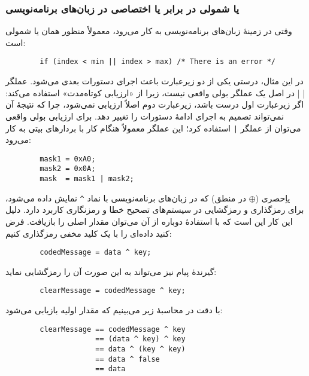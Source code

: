       \subsubsection*{یا شمولی در برابر یا اختصاصی در زبان‌های برنامه‌نویسی}
      وقتی  در زمینهٔ زبان‌های برنامه‌نویسی به کار می‌رود، معمولاً منظور همان یا شمولی است:
        \begin{latin}
        \begin{verbatim}
        if (index < min || index > max) /* There is an error */
        \end{verbatim}
        \end{latin}
        در این مثال، درستی یکی از دو زیرعبارت باعث اجرای دستورات بعدی می‌شود. عملگر \verb| || | در اصل یک عملگر بولی واقعی نیست، زیرا از «ارزیابی کوتاه‌مدت»  استفاده می‌کند: اگر زیرعبارت اول درست باشد، زیرعبارت دوم اصلاً ارزیابی نمی‌شود، چرا که نتیجهٔ آن نمی‌تواند تصمیم به اجرای ادامهٔ دستورات را تغییر دهد.
        برای ارزیابی بولی واقعی می‌توان از عملگر \verb!|! استفاده کرد؛ این عملگر معمولاً هنگام کار با بردارهای بیتی به کار می‌رود:
        \begin{latin}
        \begin{verbatim}
        mask1 = 0xA0;
        mask2 = 0x0A;
        mask  = mask1 | mask2;
        \end{verbatim}
        \end{latin}
        یاِحصری ($\oplus$ در منطق) که در زبان‌های برنامه‌نویسی با نماد \verb|^| نمایش داده می‌شود، برای رمزگذاری و رمزگشایی در سیستم‌های تصحیح خطا و رمزنگاری کاربرد دارد. دلیل این کار این است که با استفادهٔ دوباره از آن می‌توان مقدار اصلی را بازیافت. فرض کنید داده‌ای را با یک کلید مخفی رمزگذاری کنیم:
        \begin{latin}
        \begin{verbatim}
        codedMessage = data ^ key;
        \end{verbatim}
        \end{latin}
        گیرندهٔ پیام نیز می‌تواند به این صورت آن را رمزگشایی نماید:
        \begin{latin}
        \begin{verbatim}
        clearMessage = codedMessage ^ key;
        \end{verbatim}
        \end{latin}
        با دقت در محاسبهٔ زیر می‌بینیم که مقدار اولیه بازیابی می‌شود:
        \begin{latin}
        \begin{verbatim}
        clearMessage == codedMessage ^ key
                     == (data ^ key) ^ key
                     == data ^ (key ^ key)
                     == data ^ false
                     == data
        \end{verbatim}
        \end{latin}
        
